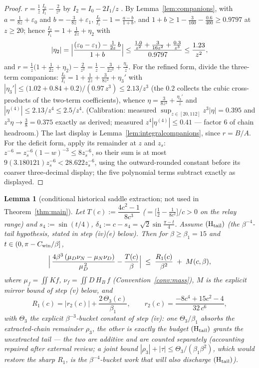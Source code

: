 \documentclass[11pt]{article}
\newtheorem{lemma}[theorem]{Lemma}
\theoremstyle{remark}
\begin{document}
\begin{proof}
$r=\tfrac1z\,\tfrac{I_0}{I_1}-\tfrac{2}{z^2}$ by
$I_2=I_0-2I_1/z$ \cite[10.29.1]{DLMF}. By
Lemma~\ref{lem:companions}, with $a=\tfrac1{8z}+\varepsilon_0$ and
$b=-\tfrac3{8z}+\varepsilon_1$,
$\tfrac{I_0}{I_1}-1=\tfrac{a-b}{1+b}$, and $1+b\ge1-\tfrac3{160}
-\tfrac{0.6}{400}\ge0.9797$ at $z\ge20$; hence
$\tfrac{I_0}{I_1}=1+\tfrac1{2z}+\eta_2$ with
\[
|\eta_2|=\Bigl|\frac{(\varepsilon_0-\varepsilon_1)
-\tfrac1{2z}\,b}{1+b}\Bigr|
\le\frac{\tfrac{1.0}{z^2}+\tfrac{3}{16z^2}+\tfrac{0.3}{z^3}}
{0.9797}\le\frac{1.23}{z^2},
\]
and $r=\tfrac1z\bigl(1+\tfrac1{2z}+\eta_2\bigr)-\tfrac2{z^2}
=\tfrac1z-\tfrac3{2z^2}+\tfrac{\eta_2}z$. For the refined form,
divide the three-term companions: $\tfrac{I_0}{I_1}
=1+\tfrac1{2z}+\tfrac3{8z^2}+\eta_3'$ with $|\eta_3'|\le
\bigl(1.02+0.84+0.2\bigr)/(0.97\,z^3)\le2.13/z^3$ \textup{(}the
$0.2$ collects the cubic cross-products of the two-term
coefficients\textup{)}, whence $\eta=\tfrac3{8z^3}+\tfrac{\eta_3'}z$
and $|\eta^{(4)}|\le2.13/z^4\le2.5/z^4$. \textup{(}Calibration:
measured $\sup_{z\in[20,112]}z^3|\eta|=0.395$ and
$z^3\eta\to\tfrac38=0.375$ exactly as derived; measured
$z^4|\eta^{(4)}|\le0.41$ --- factor $6$ of chain headroom.\textup{)}
The last display is Lemma~\ref{lem:integralcompanions}, since
$r=B/A$.  For the deficit form, apply its remainder at $z$ and $z_s$:
$z^{-6}=z_s^{-6}(1-w)^{-3}\le8z_s^{-6}$, so their sum is at most
$9(3.180121)z_s^{-6}<28.622z_s^{-6}$, using the outward-rounded
constant before its coarser three-decimal display; the five polynomial
terms subtract exactly as displayed.
\end{proof}

\begin{lemma}[conditional historical saddle extraction; not used in
Theorem~\ref{thm:main}]\label{lem:extraction}
Let $T(c):=\dfrac{4c^2-1}{8c^3}$ \textup{(}$=\bigl[\tfrac12-
\tfrac1{8c^2}\bigr]/c>0$ on the relay range\textup{)} and
$s_4:=\sin(t/4)$, $\delta_4:=c-s_4=\sqrt2\sin\tfrac{\pi-t}{4}$.
\emph{Assume $(\mathrm H_{\rm tail})$} \textup{(}the
$\beta^{-4}$-tail hypothesis, stated in step \textup{(iv)(e)}
below\textup{)}. Then for $\beta\ge\beta_1=15$ and
$t\in(0,\pi-C_{\rm win}/\beta]$,
\[
\Bigl|\,\frac{4\beta^3\,(\mu_D\nu_N-\mu_N\nu_D)}{\mu_D^{\,2}}
-\frac{T(c)}{\beta}\Bigr|
\;\le\;\frac{R_1(c)}{\beta^2}\;+\;M(c,\beta),
\]
where $\mu_f=\iint Kf$, $\nu_f=\iint D\,H_B\,f$
\textup{(}Convention~\ref{conv:mass}\textup{)}, $M$ is the explicit
mirror bound of step \textup{(v)} below, and
\[
R_1(c)=|r_2(c)|+\frac{2\,\Theta_3(c)}{\beta_1},\qquad
r_2(c)=\frac{-8c^4+15c^2-4}{32\,c^{6}},
\]
with $\Theta_3$ the explicit $\beta^{-3}$-bucket constant of step
\textup{(iv)}: one $\Theta_3/\beta_1$ absorbs the extracted-chain
remainder $\rho_3$, the other is exactly the budget
$(\mathrm H_{\rm tail})$ grants the unextracted tail --- the two
are additive and are counted separately \textup{(}accounting
repaired after external review; a joint bound
$|\rho_3|+|\tau|\le\Theta_3/(\beta_1\beta^2)$, which would restore
the sharp $R_1$, is the $\beta^{-4}$-bucket work that will also
discharge $(\mathrm H_{\rm tail})$\textup{)}.
\end{lemma}
\end{document}
